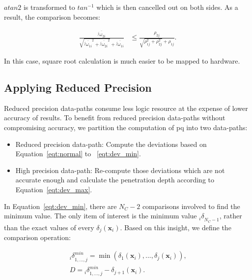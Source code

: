 $atan2$ is transformed to $tan^{-1}$ which is then cancelled out on both sides.
As a result, the comparison becomes:

\begin{equation}
\begin{aligned}
\frac{\overline{{^j\omega}_{2i}}}{\sqrt{\overline{{^j\omega}_{1i}}^2+\overline{{^j\omega}_{2i}}^2}+\overline{{^j\omega}_{1i}}} &\le \frac{\rho_{2j}}{\sqrt{\rho_{1j}^2+\rho_{2j}^2}+\rho_{1j}} \mbox{.}
\end{aligned}
\label{eqt:check3}
\end{equation}

In this case, square root calculation is much easier to be mapped to hardware.

\subsection{Applying Reduced Precision}
\label{sec:precision_mixed_precision}
Reduced precision data-paths consume less logic resource at the expense of lower accuracy of results.
To benefit from reduced precision data-paths without compromising accuracy, we partition the computation of \gls{pq} into two data-paths:

\begin{itemize}
\item Reduced precision data-path: Compute the deviations based on Equation~\ref{eqt:normal} to ~\ref{eqt:dev_min}.
\item High precision data-path: Re-compute those deviations which are not accurate enough and calculate the penetration depth according to Equation~\ref{eqt:dev_max}.
\end{itemize}

In Equation~\ref{eqt:dev_min}, there are $N_C-2$ comparisons involved to find the minimum value.
The only item of interest is the minimum value ${_i\delta}_{N_C-1}$, rather than the exact values of every $\delta_{j}(\textbf{x}_i)$.
Based on this insight, we define the comparison operation:

\begin{equation}
\begin{aligned}
{_i\delta}^{min}_{1,...,j} = \min \left ( {\delta_{1}(\textbf{x}_i),...,\delta_{j}(\textbf{x}_i)} \right ) \mbox{,} \\
D = {_i\delta}^{min}_{1,...,j} - \delta_{j+1}(\textbf{x}_i) \mbox{.}
\end{aligned}
\label{eqt:comparison}
\end{equation}


